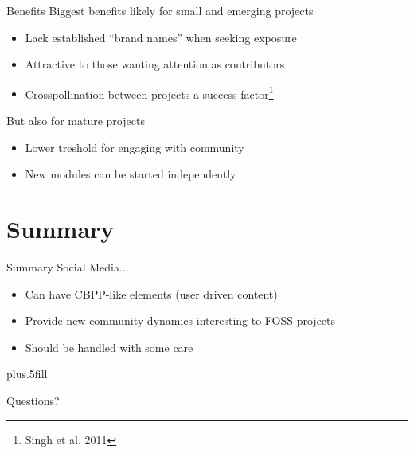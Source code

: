 \documentclass{beamer}
\begin{document}
\begin{frame}{Benefits}
  Biggest benefits likely for small and emerging projects
  \begin{itemize}
  \item Lack established ``brand names'' when seeking exposure
  \item Attractive to those wanting attention as contributors
    \item Crosspollination between projects a success
      factor\footnote{Singh et al. 2011}
  \end{itemize}
  
  But also for mature projects
  \begin{itemize}
  \item Lower treshold for engaging with community
  \item New modules can be started independently
  \end{itemize}
\end{frame}

\section*{Summary}

\begin{frame}{Summary}
  Social Media...
  \begin{itemize}
  \item Can have CBPP-like elements (user driven content)
  \item Provide new community dynamics interesting to FOSS
    projects
  \item Should be handled with some care
  \end{itemize}


  \pause
  \vskip0pt plus.5fill

  Questions?
\end{frame}
\end{document}
